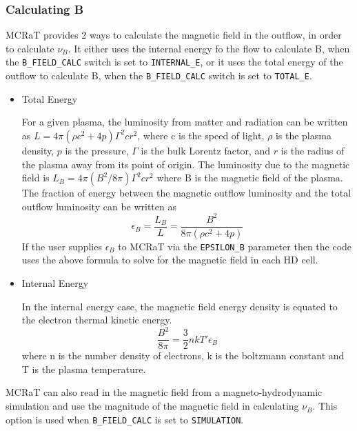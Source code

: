 \documentclass[12pt,a4paper]{article}
\begin{document}
\subsubsection{Calculating B}
MCRaT provides 2 ways to calculate the magnetic field in the outflow, in order to calculate $\nu_B$. It either uses the internal energy fo the flow to calculate B, when the \texttt{B\_FIELD\_CALC} switch is set to \texttt{INTERNAL\_E}, or it uses the total energy of the outflow to calculate B, when the \texttt{B\_FIELD\_CALC} switch is set to \texttt{TOTAL\_E}.
\begin{itemize}
\item Total Energy

For a given plasma, the luminosity from matter and radiation can be written as $L=4\pi(\rho c^2+4p)\Gamma^2cr^2$, where c is the speed of light, $\rho$ is the plasma density, $p$ is the pressure, $\Gamma$ is the bulk Lorentz factor, and $r$ is the radius of the plasma away from its point of origin. The luminosity due to the magnetic field is $L_B=4\pi(B^2/8\pi)\Gamma^2cr^2$ where B is the magnetic field of the plasma. The fraction of energy between the magnetic outflow luminosity and the total outflow luminosity can be written as
\begin{equation}
\epsilon_{B}=\frac{L_B}{L}=\frac{B^2}{8\pi(\rho c^2+4p)}
\end{equation}
If the user supplies $\epsilon_{B}$ to MCRaT via the \texttt{EPSILON\_B} parameter then the code uses the above formula to solve for the magnetic field in each HD cell.

\item Internal Energy

In the internal energy case, the magnetic field energy density is equated to the electron thermal kinetic energy.
\begin{equation}
\frac{B^2}{8\pi}=\frac{3}{2}nkT'\epsilon_{B}
\end{equation}
where n is the number density of electrons, k is the boltzmann constant and T is the plasma temperature.
\end{itemize}

MCRaT can also read in the magnetic field from a magneto-hydrodynamic simulation and use the magnitude of the magnetic field in calculating $\nu_B$. This option is used when \texttt{B\_FIELD\_CALC} is set to \texttt{SIMULATION}.
\end{document}
